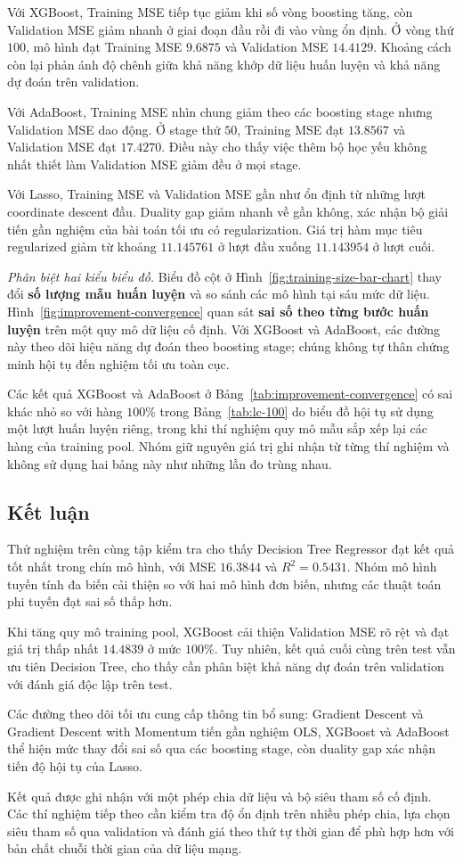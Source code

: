 Với XGBoost, Training MSE tiếp tục giảm khi số vòng boosting
tăng, còn Validation MSE giảm nhanh ở giai đoạn đầu rồi
đi vào vùng ổn định. Ở vòng thứ $100$, mô hình đạt Training MSE
$9.6875$ và Validation MSE $14.4129$. Khoảng cách còn lại
phản ánh độ chênh giữa khả năng khớp dữ liệu huấn luyện
và khả năng dự đoán trên validation.

Với AdaBoost, Training MSE nhìn chung giảm theo các boosting
stage nhưng Validation MSE dao động. Ở stage thứ $50$,
Training MSE đạt $13.8567$ và Validation MSE đạt $17.4270$.
Điều này cho thấy việc thêm bộ học yếu không nhất thiết
làm Validation MSE giảm đều ở mọi stage.

Với Lasso, Training MSE và Validation MSE gần như ổn định
từ những lượt coordinate descent đầu. Duality gap giảm nhanh
về gần không, xác nhận bộ giải tiến gần nghiệm của
bài toán tối ưu có regularization. Giá trị hàm mục tiêu
regularized giảm từ khoảng $11.145761$ ở lượt đầu xuống
$11.143954$ ở lượt cuối.

\textit{Phân biệt hai kiểu biểu đồ.}
Biểu đồ cột ở Hình~\ref{fig:training-size-bar-chart} thay đổi
\textbf{số lượng mẫu huấn luyện} và so sánh các mô hình tại
sáu mức dữ liệu. Hình~\ref{fig:improvement-convergence}
quan sát \textbf{sai số theo từng bước huấn luyện} trên một
quy mô dữ liệu cố định. Với XGBoost và AdaBoost, các đường
này theo dõi hiệu năng dự đoán theo boosting stage; chúng
không tự thân chứng minh hội tụ đến nghiệm tối ưu toàn cục.

Các kết quả XGBoost và AdaBoost ở Bảng~\ref{tab:improvement-convergence}
có sai khác nhỏ so với hàng $100\%$ trong Bảng~\ref{tab:lc-100}
do biểu đồ hội tụ sử dụng một lượt huấn luyện riêng, trong khi
thí nghiệm quy mô mẫu sắp xếp lại các hàng của training pool.
Nhóm giữ nguyên giá trị ghi nhận từ từng thí nghiệm và
không sử dụng hai bảng này như những lần đo trùng nhau.

\subsection{Kết luận}

Thử nghiệm trên cùng tập kiểm tra cho thấy Decision Tree
Regressor đạt kết quả tốt nhất trong chín mô hình,
với MSE $16.3844$ và $R^2=0.5431$.
Nhóm mô hình tuyến tính đa biến cải thiện so với hai mô hình
đơn biến, nhưng các thuật toán phi tuyến đạt sai số thấp hơn.

Khi tăng quy mô training pool, XGBoost cải thiện Validation MSE
rõ rệt và đạt giá trị thấp nhất $14.4839$ ở mức $100\%$.
Tuy nhiên, kết quả cuối cùng trên test vẫn ưu tiên Decision Tree,
cho thấy cần phân biệt khả năng dự đoán trên validation
với đánh giá độc lập trên test.

Các đường theo dõi tối ưu cung cấp thông tin bổ sung:
Gradient Descent và Gradient Descent with Momentum tiến gần
nghiệm OLS, XGBoost và AdaBoost thể hiện mức thay đổi sai số
qua các boosting stage, còn duality gap xác nhận tiến độ
hội tụ của Lasso.

Kết quả được ghi nhận với một phép chia dữ liệu và bộ siêu
tham số cố định. Các thí nghiệm tiếp theo cần kiểm tra độ
ổn định trên nhiều phép chia, lựa chọn siêu tham số qua
validation và đánh giá theo thứ tự thời gian để phù hợp hơn
với bản chất chuỗi thời gian của dữ liệu mạng.